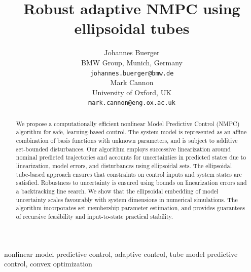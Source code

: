 \documentclass{IEEEtran}
\theoremstyle{definition}
\theoremstyle{remark}
\begin{document}
\title{Robust adaptive NMPC using ellipsoidal tubes}
\author{\begin{tabular}{@{}c@{}}
Johannes Buerger\\BMW Group, Munich, Germany\\
\texttt{johannes.buerger@bmw.de}
\end{tabular}
\qquad\qquad
\begin{tabular}{@{}c@{}}
Mark Cannon\\
University of Oxford, UK\\
\texttt{mark.cannon@eng.ox.ac.uk}
\end{tabular}
\vspace{-1.5\baselineskip}}


\maketitle

\begin{abstract}
We propose a computationally efficient nonlinear Model Predictive Control (NMPC) algorithm for safe, learning-based control. The system model is  represented as an affine combination of basis functions with unknown parameters, and is subject to additive set-bounded disturbances.
%
Our algorithm employs successive linearization around nominal predicted trajectories and accounts for uncertainties in predicted states due to linearization, model errors, and disturbances using ellipsoidal sets.
%
The ellipsoidal tube-based approach ensures that constraints on control inputs and system states are satisfied. Robustness to uncertainty is ensured using bounds on linearization errors and a backtracking line search.
%
We show that the ellipsoidal embedding of model uncertainty scales favourably with system dimensions in numerical simulations.
%
The algorithm incorporates set membership parameter estimation, and provides guarantees of recursive feasibility and input-to-state practical stability.
\end{abstract}

\begin{IEEEkeywords}
nonlinear model predictive control, adaptive control, tube model predictive control, convex optimization
\end{IEEEkeywords}
\end{document}
